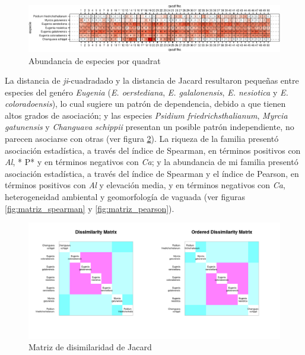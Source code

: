 \documentclass[11pt,]{article}
\begin{document}
\begin{figure}
\centering
\includegraphics{manuscrito_files/figure-latex/unnamed-chunk-3-1.pdf}
\caption{\label{fig:abun_sp_q}Abundancia de especies por quadrat}
\end{figure}

La distancia de \emph{ji}-cuadradado y la distancia de Jacard resultaron
pequeñas entre especies del genéro \emph{Eugenia} (\emph{E.
oerstediana}, \emph{E. galalonensis}, \emph{E. nesiotica} y \emph{E.
coloradoensis}), lo cual sugiere un patrón de dependencia, debido a que
tienen altos grados de asociación; y las especies \emph{Psidium
friedrichsthalianum}, \emph{Myrcia gatunensis} y \emph{Changuava
schippii} presentan un posible patrón independiente, no parecen
asociarse con otras (ver figura \ref{fig:matriz_Jacard}). La riqueza de
la familia presentó asociación estadística, a través del índice de
Spearman, en términos positivos con \emph{Al}, * P* y en términos
negativos con \emph{Ca}; y la abundancia de mi familia presentó
asociación estadística, a través del índice de Spearman y el índice de
Pearson, en términos positivos con \emph{Al} y elevación media, y en
términos negativos con \emph{Ca}, heterogeneidad ambiental y
geomorfología de vaguada (ver figuras \ref{fig:matriz_spearman} y
\ref{fig:matriz_pearson}).

\begin{figure}
\centering
\includegraphics{Disimilaridad_.png}
\caption{Matriz de disimilaridad de Jacard \label{fig:matriz_Jacard}}
\end{figure}
\end{document}
